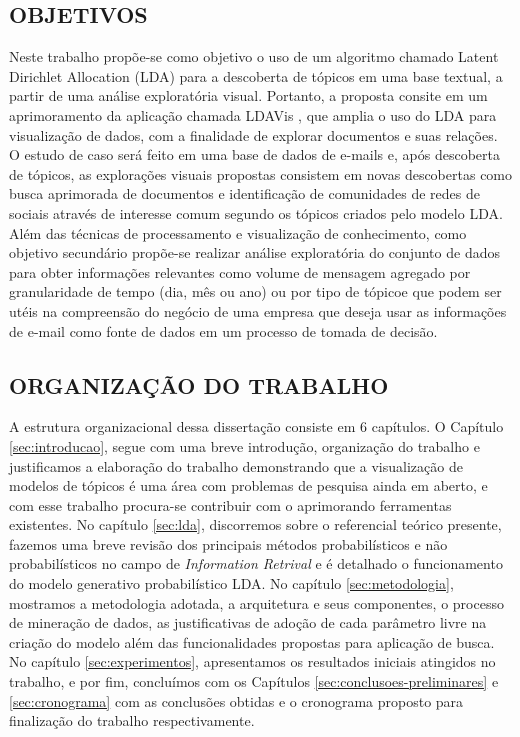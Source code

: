 \documentclass[12pt,a4paper]{article}
\begin{document}
\subsection{OBJETIVOS} \label{sec:objetivo}

Neste trabalho propõe-se como objetivo o uso de um algoritmo chamado Latent Dirichlet Allocation (LDA) \cite{blei2003latent} para a descoberta de tópicos em uma base textual, a partir de uma análise exploratória visual. Portanto, a proposta consite em um aprimoramento da aplicação chamada LDAVis  \cite{sievert2014ldavis}, que amplia o uso do LDA para visualização de dados, com a finalidade de explorar documentos e suas relações. O estudo de caso será feito em uma base de dados de e-mails e, após descoberta de tópicos, as explorações visuais propostas consistem em novas descobertas como busca aprimorada de documentos e identificação de  comunidades de redes de sociais através de interesse comum segundo os tópicos criados pelo modelo LDA. Além das técnicas de processamento e visualização de conhecimento, como objetivo secundário propõe-se realizar análise exploratória do conjunto de dados para obter informações relevantes como volume de mensagem agregado por granularidade de tempo (dia, mês ou ano) ou por tipo de tópicoe que podem ser utéis na compreensão do negócio de uma empresa que deseja usar as informações de e-mail como fonte de dados em um processo de tomada de decisão.


\subsection{ORGANIZAÇÃO DO TRABALHO} \label{sec:organizacao}

 A estrutura organizacional dessa dissertação consiste em 6 capítulos. O Capítulo \ref{sec:introducao}, segue com uma breve introdução, organização do trabalho e justificamos a elaboração do trabalho
  demonstrando que a visualização de modelos de tópicos é uma área com problemas de pesquisa ainda em aberto, e com esse trabalho procura-se contribuir com o aprimorando ferramentas existentes. 
  No capítulo \ref{sec:lda}, discorremos sobre o referencial teórico presente, fazemos uma breve revisão dos principais métodos probabilísticos e não probabilísticos no campo de \textit{Information Retrival}
  e é detalhado o funcionamento do modelo generativo probabilístico LDA. No capítulo \ref{sec:metodologia}, mostramos a metodologia adotada, 
  a arquitetura e seus componentes, o processo de mineração de dados, as justificativas de adoção de cada parâmetro livre na criação do modelo além das funcionalidades propostas para
  aplicação de busca. No capítulo \ref{sec:experimentos}, apresentamos os resultados iniciais atingidos no trabalho, e por fim, concluímos com os Capítulos \ref{sec:conclusoes-preliminares} e \ref{sec:cronograma}
  com as conclusões obtidas e o cronograma proposto para finalização do trabalho respectivamente.
\end{document}

